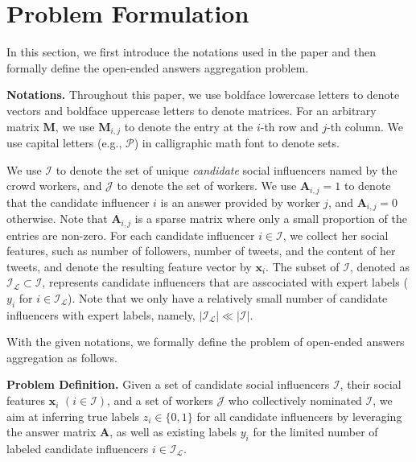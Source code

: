 \section{Problem Formulation}

In this section, we first introduce the notations used in the paper and then formally define the open-ended answers aggregation problem.

\smallskip
\noindent\textbf{Notations.} Throughout this paper, we use boldface lowercase letters to denote vectors and boldface uppercase letters to denote matrices. For an arbitrary matrix $\mathbf{M}$, we use $\mathbf{M}_{i,j}$ to denote the entry at the $i$-th row and $j$-th column. We use capital letters (e.g., $\mathcal{P}$) in calligraphic math font to denote sets.

We use $\mathcal{I}$ to denote the set of unique \emph{candidate} social influencers named by the crowd workers, and $\mathcal{J}$ to denote the set of workers. We use $\mathbf{A}_{i,j}=1$ to denote that the candidate influencer $i$ is an answer provided by worker $j$, and $\mathbf{A}_{i,j}=0$ otherwise. Note that $\mathbf{A}_{i,j}$ is a sparse matrix where only a small proportion of the entries are non-zero. 
For each candidate influencer $i \in \mathcal{I}$, we collect her social features, such as number of followers, number of tweets, and the content of her tweets, and denote the resulting feature vector by $\mathbf{x}_i$. The subset of $\mathcal{I}$, denoted as $\mathcal{I_L} \subset \mathcal{I}$, represents candidate influencers that are asscociated with expert labels ($y_i$ for $i\in \mathcal{I_L}$). Note that we only have a relatively small number of candidate influencers with expert labels, namely, $|\mathcal{I_L}| \ll |\mathcal{I}|$. %



With the given notations, we formally define the problem of open-ended answers aggregation as follows.

\smallskip
\noindent\textbf{Problem Definition.} Given a set of candidate social influencers $\mathcal{I}$, their social features $\mathbf{x}_i$ $(i \in \mathcal{I})$, and a set of workers $\mathcal{J}$ who collectively nominated $\mathcal{I}$, we aim at inferring true labels $z_i \in \{0,1\}$ for all candidate influencers by leveraging the answer matrix $\mathbf{A}$, as well as existing labels $y_i$ for the limited number of labeled candidate influencers $i\in \mathcal{I_L}$. 
